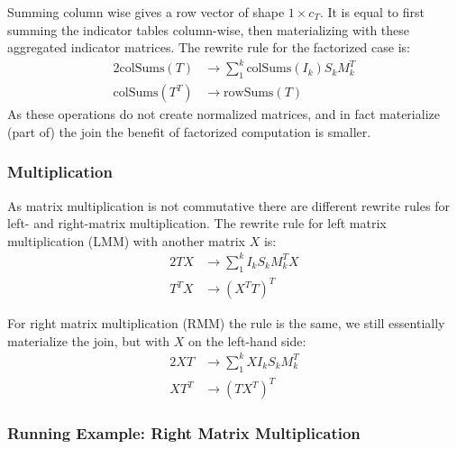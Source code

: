Summing column wise gives a row vector of shape $1 \times c_T$. It is equal to first summing the indicator tables column-wise, then materializing with these aggregated indicator matrices.  The rewrite rule for the factorized case is:
\begin{alignat*}{2}
    \text{colSums}(T)   & \rightarrow \sum_1^k \text{colSums}(I_k) S_k M_k^T \\
    \text{colSums}(T^T) & \rightarrow \text{rowSums}(T)
\end{alignat*}
As these operations do not create normalized matrices, and in fact materialize (part of) the join the benefit of factorized computation is smaller.

\subsubsection{Multiplication}
As matrix multiplication is not commutative there are different rewrite rules for left- and right-matrix multiplication. The rewrite rule for left matrix multiplication (LMM) with another matrix $X$ is:
\begin{alignat*}{2}
    TX   & \rightarrow \sum_1^k I_k S_k M_k^T X \\
    T^TX & \rightarrow (X^TT)^T
\end{alignat*}

For right matrix multiplication (RMM) the rule is the same, we still essentially materialize the join, but with $X$ on the left-hand side:
\begin{alignat*}{2}
    XT   & \rightarrow \sum_1^k X I_k S_k M_k^T \\
    XT^T & \rightarrow (TX^T)^T
\end{alignat*}

\subsubsection{Running Example: Right Matrix Multiplication}

